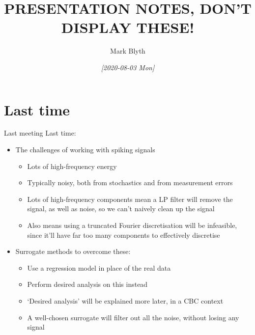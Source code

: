 \documentclass[presentation]{beamer}
\author{Mark Blyth}
\date{\textit{[2020-08-03 Mon]}}
\title{PRESENTATION NOTES, DON'T DISPLAY THESE!}
\begin{document}
\maketitle

\section{Last time}
\label{sec:org3f06930}
\begin{frame}[plain,label={sec:orgaa9fe4c}]{Last meeting}
Last time: 

\begin{itemize}
\item The challenges of working with spiking signals
\begin{itemize}
\item Lots of high-frequency energy
\item Typically noisy, both from stochastics and from measurement errors
\item Lots of high-frequency components mean a LP filter will remove the signal, as well as noise, so we can't naively clean up the signal
\item Also means using a truncated Fourier discretisation will be infeasible, since it'll have far too many components to effectively discretise
\end{itemize}

\item Surrogate methods to overcome these:
\begin{itemize}
\item Use a regression model in place of the real data
\item Perform desired analysis on this instead
\item `Desired analysis' will be explained more later, in a CBC context
\item A well-chosen surrogate will filter out all the noise, without losing any signal
\end{itemize}
\end{itemize}
\end{frame}
\end{document}
